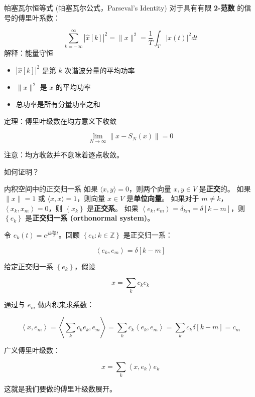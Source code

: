 \documentclass[
  ignorenonframetext,
]{beamer}
\providecommand{\tightlist}{%
  \setlength{\itemsep}{0pt}\setlength{\parskip}{0pt}}
\begin{document}
\begin{frame}{帕塞瓦尔恒等式 (帕塞瓦尔公式，Parseval's Identity)}
\protect{}\label{ux5e15ux585eux74e6ux5c14ux6052ux7b49ux5f0f-ux5e15ux585eux74e6ux5c14ux516cux5f0fparsevals-identity}
对于具有有限 \textbf{2-范数} 的信号的傅里叶系数：

\[
\sum_{k=-\infty}^{\infty}|\hat{x}[k]|^{2}=\|x\|^{2}=\frac{1}{T} \int_{T}|x(t)|^{2} d t
\] 解释：能量守恒

\begin{itemize}
\tightlist
\item
  \(|\hat{x}[k]|^{2}\) 是第 \(k\) 次谐波分量的平均功率
\item
  \(\|x\|^{2}\) 是 \(x\) 的平均功率
\item
  总功率是所有分量功率之和
\end{itemize}

定理：傅里叶级数在均方意义下收敛

\[
\lim _{N \rightarrow \infty}\left\|x-S_{N}(x)\right\|=0
\]

注意：均方收敛并不意味着逐点收敛。

如何证明？
\end{frame}

\begin{frame}{内积空间中的正交归一系}
\protect{}\label{ux5185ux79efux7a7aux95f4ux4e2dux7684ux6b63ux4ea4ux5f52ux4e00ux7cfb}
如果 \(\langle x, y\rangle=0\)，则两个向量 \(x, y \in V\)
是\textbf{正交}的。 如果 \(\|x\|=1\) 或
\(\langle x, x\rangle=1\)，则向量 \(x \in V\) 是\textbf{单位向量}。
如果对于 \(m \neq k\)，\(\left\langle x_{k}, x_{m}\right\rangle=0\)，则
\(\left\{x_{k}\right\}\) 是\textbf{正交系}。 如果
\(\left\langle e_{k}, e_{m}\right\rangle=\delta_{k m}=\delta[k-m]\)，则
\(\left\{e_{k}\right\}\) 是\textbf{正交归一系 (orthonormal system)}。

令 \(e_{k}(t)=e^{j k \frac{2 \pi}{T} t}\)。回顾
\(\left\{e_{k}: k \in \mathbb{Z}\right\}\) 是正交归一系：

\[
\left\langle e_{k}, e_{m}\right\rangle=\delta[k-m]
\]

给定正交归一系 \(\left\{e_{k}\right\}\)，假设

\[
x=\sum_{k} c_{k} e_{k}
\]

通过与 \(e_{m}\) 做内积来求系数：

\[
\left\langle x, e_{m}\right\rangle=\left\langle\sum_{k} c_{k} e_{k}, e_{m}\right\rangle=\sum_{k} c_{k}\left\langle e_{k}, e_{m}\right\rangle=\sum_{k} c_{k} \delta[k-m]=c_{m}
\]

广义傅里叶级数：

\[
x=\sum_{k}\left\langle x, e_{k}\right\rangle e_{k}
\]

这就是我们要做的傅里叶级数展开。
\end{frame}
\end{document}
